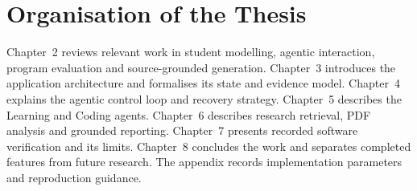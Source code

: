 \section{Organisation of the Thesis}
Chapter~2 reviews relevant work in student modelling, agentic interaction, program evaluation and source-grounded generation. Chapter~3 introduces the application architecture and formalises its state and evidence model. Chapter~4 explains the agentic control loop and recovery strategy. Chapter~5 describes the Learning and Coding agents. Chapter~6 describes research retrieval, PDF analysis and grounded reporting. Chapter~7 presents recorded software verification and its limits. Chapter~8 concludes the work and separates completed features from future research. The appendix records implementation parameters and reproduction guidance.
